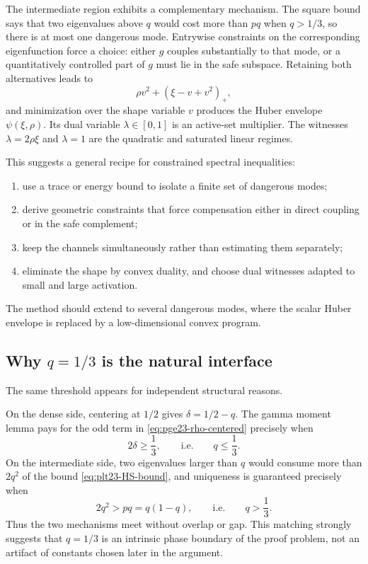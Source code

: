\documentclass[11pt]{article}
\numberwithin{equation}{section}
\begin{document}
The intermediate region exhibits a complementary mechanism.
The square bound says that two eigenvalues above $q$ would cost more than $pq$ when $q>1/3$, so there is at most one dangerous mode.
Entrywise constraints on the corresponding eigenfunction force a choice: either $g$ couples substantially to that mode, or a quantitatively controlled part of $g$ must lie in the safe subspace.
Retaining both alternatives leads to
\[
  \rho v^2+(\xi-v+v^2)_+,
\]
and minimization over the shape variable $v$ produces the Huber envelope $\psi(\xi,\rho)$.
Its dual variable $\lambda\in[0,1]$ is an active-set multiplier.
The witnesses $\lambda=2\rho\xi$ and $\lambda=1$ are the quadratic and saturated linear regimes.

This suggests a general recipe for constrained spectral inequalities:
\begin{enumerate}[leftmargin=2.2em]
  \item use a trace or energy bound to isolate a finite set of dangerous modes;
  \item derive geometric constraints that force compensation either in direct coupling or in the safe complement;
  \item keep the channels simultaneously rather than estimating them separately;
  \item eliminate the shape by convex duality, and choose dual witnesses adapted to small and large activation.
\end{enumerate}
The method should extend to several dangerous modes, where the scalar Huber envelope is replaced by a low-dimensional convex program.

\subsection{Why \texorpdfstring{$q=1/3$}{q=1/3} is the natural interface}

The same threshold appears for independent structural reasons.

On the dense side, centering at $1/2$ gives $\delta=1/2-q$.
The gamma moment lemma pays for the odd term in \eqref{eq:pge23-rho-centered} precisely when
\[
  2\delta\ge\frac{1}{3},
  \qquad\text{i.e.}\qquad q\le\frac{1}{3}.
\]
On the intermediate side, two eigenvalues larger than $q$ would consume more than $2q^2$ of the bound \eqref{eq:plt23-HS-bound}, and uniqueness is guaranteed precisely when
\[
  2q^2>pq=q(1-q),
  \qquad\text{i.e.}\qquad q>\frac{1}{3}.
\]
Thus the two mechanisms meet without overlap or gap.
This matching strongly suggests that $q=1/3$ is an intrinsic phase boundary of the proof problem, not an artifact of constants chosen later in the argument.
\appendix
\end{document}
